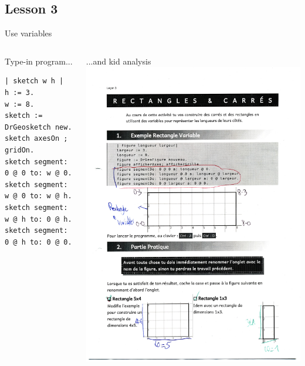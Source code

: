 \documentclass{beamer}
\begin{document}
\subsection{Lesson 3}
\begin{frame}[fragile]{Use variables}
  \begin{columns}[t]
    \vspace*{10pt}
    \begin{column}{0.5\textwidth}
      Type-in program...
      \vspace*{10pt}
      \fontsize{9pt}{8pt}\selectfont
    \begin{lstlisting}[language=Smalltalk]
| sketch w h |
h := 3.
w := 8.
sketch := DrGeosketch new.
sketch axesOn ; gridOn.
sketch segment: 0 @ 0 to: w @ 0.
sketch segment: w @ 0 to: w @ h.
sketch segment: w @ h to: 0 @ h.
sketch segment: 0 @ h to: 0 @ 0.
    \end{lstlisting}
\end{column}
\begin{column}{0.5\textwidth}
  ...and kid analysis
      \includegraphics[width=1.3\textwidth]{lesson3Analysis.png}
    \end{column}  
  \end{columns}  
\end{frame}
\end{document}
